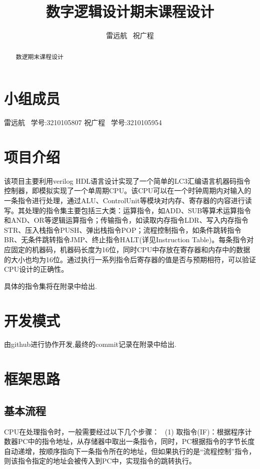 \documentclass{article}
\title{数字逻辑设计期末课程设计}
\author{雷远航 \ 祝广程}
\begin{document}
\setcounter{tocdepth}{5}  %



\maketitle

\begin{abstract}
数逻期末课程设计


\end{abstract}


\tableofcontents
\newpage



\section{小组成员}
雷远航   \ 学号:3210105807
祝广程   \ 学号:3210105954


\section{项目介绍}
该项目主要利用verilog HDL语言设计实现了一个简单的LC3汇编语言机器码指令控制器，即模拟实现了一个单周期CPU。该CPU可以在一个时钟周期内对输入的一条指令进行处理，通过ALU、ControlUnit等模块对内存、寄存器的内容进行读写。其处理的指令集主要包括三大类：运算指令，如ADD、SUB等算术运算指令和AND、OR等逻辑运算指令；传输指令，如读取内存指令LDR、写入内存指令STR、压入栈指令PUSH、弹出栈指令POP；流程控制指令，如条件跳转指令BR、无条件跳转指令JMP、终止指令HALT(详见Instruction Table)。每条指令对应固定的机器码，机器码长度为16位，同时CPU中存放在寄存器和内存中的数据的大小也均为16位。通过执行一系列指令后寄存器的值是否与预期相符，可以验证CPU设计的正确性。

具体的指令集将在附录中给出.


\section{开发模式}
由github进行协作开发,最终的commit记录在附录中给出.

\section{框架思路}

\subsection{基本流程}
CPU在处理指令时，一般需要经过以下几个步骤： 
(1) 取指令(IF)：根据程序计数器PC中的指令地址，从存储器中取出一条指令，同时，PC根据指令的字节长度自动递增，按顺序指向下一条指令所在的地址，但如果执行的是“流程控制”指令，则该指令指定的地址会被传入到PC中，实现指令的跳转执行。 
\end{document}
